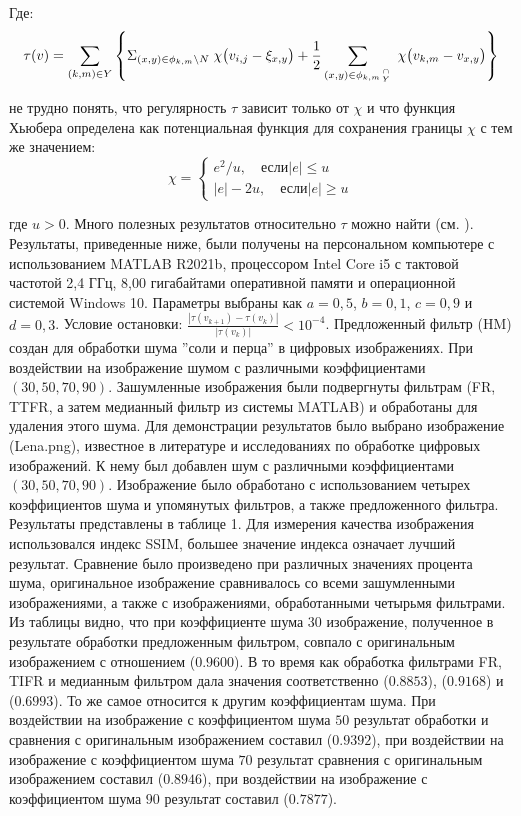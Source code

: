 \noindent Где:
\begin{equation*}
    \tau(v)=\sum_{(k,m)\in Y}\left\{\Sigma_{(x,y)\in\phi_{k,m}\backslash{N}}\;\chi\bigl(v_{i,j}-\xi_{x,y}\bigr)+\frac{1}{2}\sum_{(x,y)\in\phi_{k,m}\stackover{\cap}{Y}}\;\chi\bigl(v_{k,m}-v_{x,y}\bigr)\right\}
\end{equation*}

\noindent не трудно понять, что регулярность $\tau$ зависит только от $\chi$ и
что функция Хьюбера определена как потенциальная функция для сохранения границы
$\chi$ с тем же значением:
\begin{equation*}
    \chi = \begin{cases} 
        e^{2}/u, \quad \text{если} |e|\leq u \\ 
        |e|-2u, \quad \text{если} |e| \ge u
    \end{cases}
\end{equation*}

\noindent где $u > 0$. Много полезных результатов относительно $\tau$ можно
найти (см. \cite{art24,art25,art26}). Результаты, приведенные ниже, были
получены на персональном компьютере с использованием MATLAB R2021b, процессором
Intel Core i5 с тактовой частотой 2,4 ГГц, 8,00 гигабайтами оперативной памяти и
операционной системой Windows 10. Параметры выбраны как $a = 0,5$, $b = 0,1$, $c
= 0,9$ и $d = 0,3$. Условие остановки:
${\frac{|\tau(v_{k+1})-\tau(v_{k})|}{|\tau(v_{k})|}}<10^{-4}$. Предложенный
фильтр (HM) создан для обработки шума ''соли и перца'' в цифровых изображениях. При
воздействии на изображение шумом с различными коэффициентами
$\left(30,50,70,90\right)$. Зашумленные изображения были подвергнуты фильтрам
(FR, TTFR, а затем медианный фильтр из системы MATLAB) и обработаны для удаления
этого шума. Для демонстрации результатов было выбрано изображение (Lena.png),
известное в литературе и исследованиях по обработке цифровых изображений. К нему
был добавлен шум с различными коэффициентами $\left(30,50,70,90\right)$.
Изображение было обработано с использованием четырех коэффициентов шума и
упомянутых фильтров, а также предложенного фильтра. Результаты представлены в
таблице 1. Для измерения качества изображения использовался индекс SSIM, большее
значение индекса означает лучший результат. Сравнение было произведено при
различных значениях процента шума, оригинальное изображение сравнивалось со
всеми зашумленными изображениями, а также с изображениями, обработанными
четырьмя фильтрами. Из таблицы видно, что при коэффициенте шума $30$
изображение, полученное в результате обработки предложенным фильтром, совпало с
оригинальным изображением с отношением ($0.9600$). В то время как обработка фильтрами FR,
TIFR и медианным фильтром дала значения соответственно ($0.8853$), ($0.9168$) и
($0.6993$). То же самое относится к другим коэффициентам шума. При воздействии на
изображение с коэффициентом шума $50$ результат обработки и сравнения с
оригинальным изображением составил ($0.9392$), при воздействии на изображение с
коэффициентом шума $70$ результат сравнения с оригинальным изображением составил
($0.8946$), при воздействии на изображение с коэффициентом шума $90$ результат
составил ($0.7877$).

